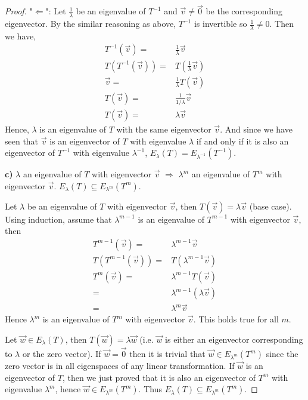 \documentclass{article}
\begin{document}
\begin{proof}
"$\Leftarrow$": Let $\frac{1}{\lambda}$ be an eigenvalue of $T^{-1}$ and $\vec{v} \ne \vec{0}$ be the corresponding eigenvector. By the similar reasoning as above, $T^{-1}$ is invertible so $\frac{1}{\lambda} \ne 0$. Then we have,
\begin{align*}
T^{-1}(\vec{v}) =& \frac{1}{\lambda} \vec{v} \\
T(T^{-1}(\vec{v})) =& T(\frac{1}{\lambda} \vec{v}) \\
\vec{v} =& \frac{1}{\lambda} T(\vec{v}) \\
T(\vec{v}) =& \frac{1}{1/\lambda} \vec{v} \\
T(\vec{v}) =& \lambda \vec{v}
\end{align*}
Hence, $\lambda$ is an eigenvalue of $T$ with the same eigenvector $\vec{v}$. And since we have seen that $\vec{v}$ is an eigenvector of $T$ with eigenvalue $\lambda$ if and only if it is also an eigenvector of $T^{-1}$ with eigenvalue $\lambda^{-1}$, $E_\lambda (T) = E_{\lambda^{-1}}(T^{-1})$.
\bigskip

\textbf{c)} $\lambda$ an eigenvalue of $T$ with eigenvector $\vec{v}$ $\Rightarrow$ $\lambda^m$ an eigenvalue of $T^m$ with eigenvector $\vec{v}$. $E_\lambda(T) \subseteq E_{\lambda^m}(T^m)$.
\smallskip

Let $\lambda$ be an eigenvalue of $T$ with eigenvector $\vec{v}$, then $T(\vec{v}) = \lambda \vec{v}$ (base case). Using induction, assume that $\lambda^{m-1}$ is an eigenvalue of $T^{m-1}$ with eigenvector $\vec{v}$, then 
\begin{align*}
T^{m-1}(\vec{v}) =& \lambda^{m-1} \vec{v} \\
T(T^{m-1}(\vec{v})) =& T(\lambda^{m-1} \vec{v}) \\
T^m(\vec{v}) =& \lambda^{m-1}T(\vec{v}) \\
=& \lambda^{m-1} ( \lambda \vec{v}) \\
=& \lambda^m \vec{v}
\end{align*}
Hence $\lambda^m$ is an eigenvalue of $T^m$ with eigenvector $\vec{v}$. This holds true for all $m$.
\smallskip

Let $\vec{w} \in E_\lambda(T)$, then $T(\vec{w}) = \lambda \vec{w}$ (i.e. $\vec{w}$ is either an eigenvector corresponding to $\lambda$ or the zero vector). If $\vec{w} = \vec{0}$ then it is trivial that $\vec{w} \in E_{\lambda^m}(T^m)$ since the zero vector is in all eigenspaces of any linear transformation. If $\vec{w}$ is an eigenvector of $T$, then we just proved that it is also an eigenvector of $T^m$ with eigenvalue $\lambda^m$, hence $\vec{w} \in E_{\lambda^m}(T^m)$. Thus $E_\lambda(T) \subseteq E_{\lambda^m}(T^m)$.
\bigskip


\end{proof}
\end{document}
